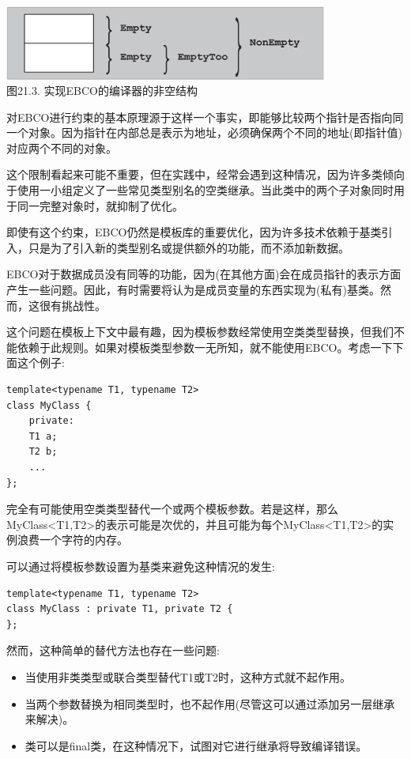 \begin{center}
\includegraphics[width=0.8\textwidth]{content/3/chapter21/images/3.png} \\
图21.3. 实现EBCO的编译器的非空结构
\end{center}

对EBCO进行约束的基本原理源于这样一个事实，即能够比较两个指针是否指向同一个对象。因为指针在内部总是表示为地址，必须确保两个不同的地址(即指针值)对应两个不同的对象。

这个限制看起来可能不重要，但在实践中，经常会遇到这种情况，因为许多类倾向于使用一小组定义了一些常见类型别名的空类继承。当此类中的两个子对象同时用于同一完整对象时，就抑制了优化。

即使有这个约束，EBCO仍然是模板库的重要优化，因为许多技术依赖于基类引入，只是为了引入新的类型别名或提供额外的功能，而不添加新数据。


EBCO对于数据成员没有同等的功能，因为(在其他方面)会在成员指针的表示方面产生一些问题。因此，有时需要将认为是成员变量的东西实现为(私有)基类。然而，这很有挑战性。

这个问题在模板上下文中最有趣，因为模板参数经常使用空类类型替换，但我们不能依赖于此规则。如果对模板类型参数一无所知，就不能使用EBCO。考虑一下下面这个例子:

\begin{lstlisting}[style=styleCXX]
template<typename T1, typename T2>
class MyClass {
	private:
	T1 a;
	T2 b;
	...
};
\end{lstlisting}

完全有可能使用空类类型替代一个或两个模板参数。若是这样，那么MyClass<T1,T2>的表示可能是次优的，并且可能为每个MyClass<T1,T2>的实例浪费一个字符的内存。

可以通过将模板参数设置为基类来避免这种情况的发生:

\begin{lstlisting}[style=styleCXX]
template<typename T1, typename T2>
class MyClass : private T1, private T2 {
};
\end{lstlisting}

然而，这种简单的替代方法也存在一些问题:

\begin{itemize}
\item 
当使用非类类型或联合类型替代T1或T2时，这种方式就不起作用。

\item 
当两个参数替换为相同类型时，也不起作用(尽管这可以通过添加另一层继承来解决)。

\item 
类可以是final类，在这种情况下，试图对它进行继承将导致编译错误。
\end{itemize}

